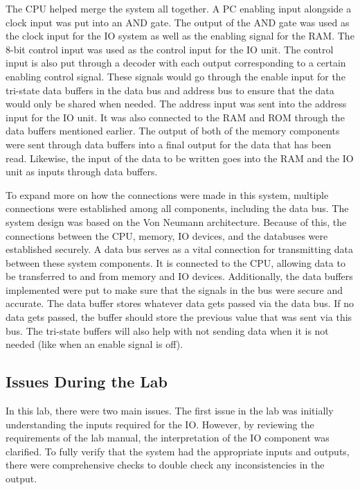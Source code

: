 \documentclass{article}
\begin{document}
The CPU helped merge the system all together. 
A PC enabling input alongside a clock input was put into an AND gate. 
The output of the AND gate was used as the clock input for the IO system as well as the enabling signal for the RAM. 
The 8-bit control input was used as the control input for the IO unit. 
The control input is also put through a decoder with each output corresponding to a certain enabling control signal. 
These signals would go through the enable input for the tri-state data buffers in the data bus and address bus to ensure that the data would only be shared when needed. 
The address input was sent into the address input for the IO unit. It was also connected to the RAM and ROM through the data buffers mentioned earlier. 
The output of both of the memory components were sent through data buffers into a final output for the data that has been read. 
Likewise, the input of the data to be written goes into the RAM and the IO unit as inputs through data buffers. 

To expand more on how the connections were made in this system, multiple connections were established among all components, including the data bus. 
The system design was based on the Von Neumann architecture. 
Because of this, the connections between the CPU, memory, IO devices, and the databuses were established securely. 
A data bus serves as a vital connection for transmitting data between these system components. 
It is connected to the CPU, allowing data to be transferred to and from memory and IO devices. 
Additionally, the data buffers implemented were put to make sure that the signals in the bus were secure and accurate. 
The data buffer stores whatever data gets passed via the data bus. 
If no data gets passed, the buffer should store the previous value that was sent via this bus. 
The tri-state buffers will also help with not sending data when it is not needed (like when an enable signal is off).

\subsection*{Issues During the Lab}
In this lab, there were two main issues. 
The first issue in the lab was initially understanding the inputs required for the IO. 
However, by reviewing the requirements of the lab manual, the interpretation of the IO component was clarified. 
To fully verify that the system had the appropriate inputs and outputs, there were comprehensive checks to double check any inconsistencies in the output.
\end{document}
